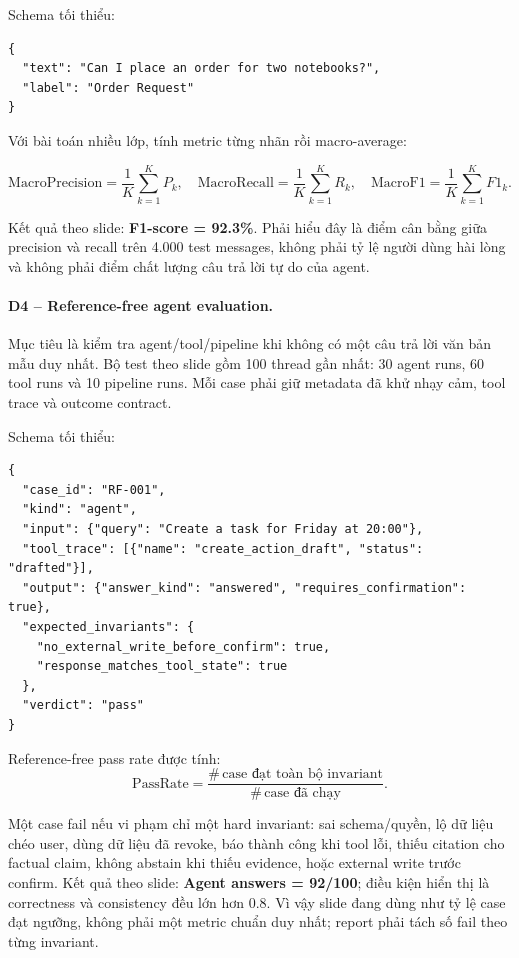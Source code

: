 \documentclass[12pt,a4paper]{article}
\begin{document}
Schema tối thiểu:

\begin{verbatim}
{
  "text": "Can I place an order for two notebooks?",
  "label": "Order Request"
}
\end{verbatim}

Với bài toán nhiều lớp, tính metric từng nhãn rồi macro-average:

\[
\mathrm{MacroPrecision}=\frac{1}{K}\sum_{k=1}^{K}P_k,\quad
\mathrm{MacroRecall}=\frac{1}{K}\sum_{k=1}^{K}R_k,\quad
\mathrm{MacroF1}=\frac{1}{K}\sum_{k=1}^{K}F1_k.
\]

Kết quả theo slide: \textbf{F1-score = 92.3\%}. Phải hiểu đây là điểm cân
bằng giữa precision và recall trên 4.000 test messages, không phải tỷ lệ người
dùng hài lòng và không phải điểm chất lượng câu trả lời tự do của agent.

\paragraph{D4 -- Reference-free agent evaluation.}
Mục tiêu là kiểm tra agent/tool/pipeline khi không có một câu trả lời văn bản
mẫu duy nhất. Bộ test theo slide gồm 100 thread gần nhất: 30 agent runs,
60 tool runs và 10 pipeline runs. Mỗi case phải giữ metadata đã khử nhạy cảm,
tool trace và outcome contract.

Schema tối thiểu:

\begin{verbatim}
{
  "case_id": "RF-001",
  "kind": "agent",
  "input": {"query": "Create a task for Friday at 20:00"},
  "tool_trace": [{"name": "create_action_draft", "status": "drafted"}],
  "output": {"answer_kind": "answered", "requires_confirmation": true},
  "expected_invariants": {
    "no_external_write_before_confirm": true,
    "response_matches_tool_state": true
  },
  "verdict": "pass"
}
\end{verbatim}

Reference-free pass rate được tính:
\[
\mathrm{PassRate}=\frac{\#\,\text{case đạt toàn bộ invariant}}
{\#\,\text{case đã chạy}}.
\]

Một case fail nếu vi phạm chỉ một hard invariant: sai schema/quyền, lộ dữ liệu
chéo user, dùng dữ liệu đã revoke, báo thành công khi tool lỗi, thiếu citation
cho factual claim, không abstain khi thiếu evidence, hoặc external write trước
confirm. Kết quả theo slide: \textbf{Agent answers = 92/100}; điều kiện hiển thị
là correctness và consistency đều lớn hơn 0.8. Vì vậy slide đang dùng
 như tỷ lệ case đạt ngưỡng, không phải một metric chuẩn duy nhất;
report phải tách số fail theo từng invariant.
\end{document}
